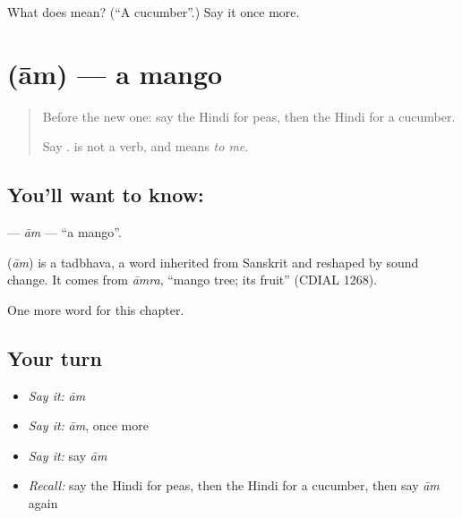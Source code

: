 \begin{tcolorbox}[breakable,colback=teal!4,colframe=teal!35!black,title={Before you move on}]
What does  mean? (\textquotedblleft{}A cucumber\textquotedblright{}.) Say it once more.
\end{tcolorbox}
\section[\texorpdfstring{\hi{आम} (ām)}{आम (ām)}]{ (ām) — a mango}

\label{lesson:HI-C139-am}



\begin{quote}
Before the new one: say the Hindi for peas, then the Hindi for a cucumber.

Say \textbf{   }. \textbf{} is not a verb, and \textbf{} means \emph{to me}.
\end{quote}

\subsection*{You'll want to know: }
\textbf{} — \emph{ām} — \textquotedblleft{}a mango\textquotedblright{}.

\begin{cousinweb}
\textbf{} (\emph{ām}) is a tadbhava, a word inherited from Sanskrit and reshaped by sound change. It comes from \emph{āmra}, \textquotedblleft{}mango tree; its fruit\textquotedblright{} (CDIAL 1268).
\end{cousinweb}

\begin{grammarlens}[title={What you've built}]
One more word for this chapter.
\end{grammarlens}

\subsection*{Your turn}
\begin{itemize}
\raggedright
  \item \emph{Say it:} \emph{ām}
  \item \emph{Say it:} \emph{ām}, once more
  \item \emph{Say it:} say \emph{ām}
  \item \emph{Recall:} say the Hindi for peas, then the Hindi for a cucumber, then say \emph{ām} again
\end{itemize}

